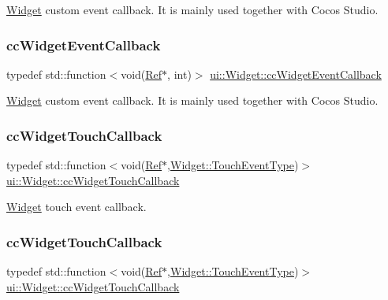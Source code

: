 \hyperlink{classui_1_1Widget}{Widget} custom event callback. It is mainly used together with Cocos Studio. \mbox{\label{classui_1_1Widget_a15b83a56c3c29442ec103100b45e56c7}} 
\subsubsection{\texorpdfstring{cc\+Widget\+Event\+Callback}{ccWidgetEventCallback}\hspace{0.1cm}{\footnotesize\ttfamily [2/2]}}
{\footnotesize\ttfamily typedef std\+::function$<$void(\hyperlink{classRef}{Ref}$\ast$, int)$>$ \hyperlink{classui_1_1Widget_a15b83a56c3c29442ec103100b45e56c7}{ui\+::\+Widget\+::cc\+Widget\+Event\+Callback}}

\hyperlink{classui_1_1Widget}{Widget} custom event callback. It is mainly used together with Cocos Studio. \mbox{\label{classui_1_1Widget_a4f2987649ba5a33d1edb8b13279b03c9}} 
\subsubsection{\texorpdfstring{cc\+Widget\+Touch\+Callback}{ccWidgetTouchCallback}\hspace{0.1cm}{\footnotesize\ttfamily [1/2]}}
{\footnotesize\ttfamily typedef std\+::function$<$void(\hyperlink{classRef}{Ref}$\ast$,\hyperlink{classui_1_1Widget_a4829c0f1cbaf1fd820a9b2ccf0c58c73}{Widget\+::\+Touch\+Event\+Type})$>$ \hyperlink{classui_1_1Widget_a4f2987649ba5a33d1edb8b13279b03c9}{ui\+::\+Widget\+::cc\+Widget\+Touch\+Callback}}

\hyperlink{classui_1_1Widget}{Widget} touch event callback. \mbox{\label{classui_1_1Widget_a4f2987649ba5a33d1edb8b13279b03c9}} 
\subsubsection{\texorpdfstring{cc\+Widget\+Touch\+Callback}{ccWidgetTouchCallback}\hspace{0.1cm}{\footnotesize\ttfamily [2/2]}}
{\footnotesize\ttfamily typedef std\+::function$<$void(\hyperlink{classRef}{Ref}$\ast$,\hyperlink{classui_1_1Widget_a4829c0f1cbaf1fd820a9b2ccf0c58c73}{Widget\+::\+Touch\+Event\+Type})$>$ \hyperlink{classui_1_1Widget_a4f2987649ba5a33d1edb8b13279b03c9}{ui\+::\+Widget\+::cc\+Widget\+Touch\+Callback}}


